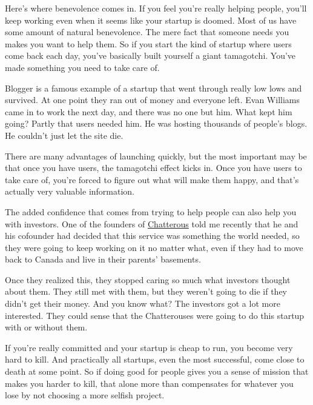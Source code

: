 Here's where benevolence
                  comes in. If you feel you're really helping people, you'll
                  keep working even when it seems like your startup is doomed.
                  Most of us have some amount of natural benevolence. The mere
                  fact that someone needs you makes you want to help them. So if
                  you start the kind of startup where users come back each day,
                  you've basically built yourself a giant tamagotchi. You've
                  made something you need to take care of.

Blogger is
                  a famous example of a startup that went through really low
                  lows and survived. At one point they ran out of money and
                  everyone left. Evan Williams came in to work the next day, and
                  there was no one but him. What kept him going? Partly that
                  users needed him. He was hosting thousands of people's blogs.
                  He couldn't just let the site die.

There are many
                  advantages of launching quickly, but the most important may be
                  that once you have users, the tamagotchi effect kicks in. Once
                  you have users to take care of, you're forced to figure out
                  what will make them happy, and that's actually very valuable
                  information.

The added confidence that comes from
                  trying to help people can also help you with investors. One of
                  the founders of
                  \href{http://chatterous.com}{Chatterous} told me
                  recently that he and his cofounder had decided that this
                  service was something the world needed, so they were going to
                  keep working on it no matter what, even if they had to move
                  back to Canada and live in their parents' basements.

Once
                  they realized this, they stopped caring so much what investors
                  thought about them. They still met with them, but they weren't
                  going to die if they didn't get their money. And you know
                  what? The investors got a lot more interested. They could
                  sense that the Chatterouses were going to do this startup with
                  or without them.

If you're really committed and
                  your startup is cheap to run, you become very hard to kill.
                  And practically all startups, even the most successful, come
                  close to death at some point. So if doing good for people
                  gives you a sense of mission that makes you harder to kill,
                  that alone more than compensates for whatever you lose by not
                  choosing a more selfish project.

